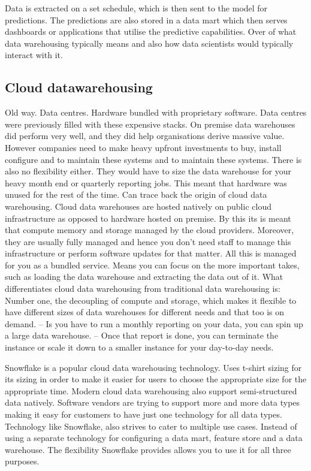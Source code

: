 \documentclass[a4paper, 11pt]{article}
\begin{document}
    Data is extracted on a set schedule, which is then sent to the model for predictions.
    The predictions are also stored in a data mart which then serves dashboards or applications that utilise the predictive capabilities.
    Over of what data warehousing typically means and also how data scientists would typically interact with it.

    \subsection{Cloud datawarehousing}

    Old way. Data centres. Hardware bundled with proprietary software.
    Data centres were previously filled with these expensive stacks.
    On premise data warehouses did perform very well, and they did help organisations derive massive value.
    However companies need to make heavy upfront investments to buy, install configure and to maintain these systems and to maintain these systems.
    There is also no flexibility either.
    They would have to size the data warehouse for your heavy month end or quarterly reporting jobs.
    This meant that hardware was unused for the rest of the time.
    Can trace back the origin of cloud data warehousing.
    Cloud data warehouses are hosted natively on public cloud infrastructure as opposed to hardware hosted on premise.
    By this its is meant that compute memory and storage managed by the cloud providers.
    Moreover, they are usually fully managed and hence you don't need staff to manage this infrastructure or perform software updates for that matter.
    All this is managed for you as a bundled service.
    Means you can focus on the more important takes, such as loading the data warehouse and extracting the data out of it.
    What differentiates cloud data warehousing from traditional data warehousing is:
    Number one, the decoupling of compute and storage, which makes it flexible to have different sizes of data warehouses for different needs and that too is on demand.
    -- Is you have to run a monthly reporting on your data, you can spin up a large data warehouse.
    -- Once that report is done, you can terminate the instance or scale it down to a smaller instance for your day-to-day needs.

    Snowflake is a popular cloud data warehousing technology.
    Uses t-shirt sizing for its sizing in order to make it easier for users to choose the appropriate size for the appropriate time.
    Modern cloud data warehousing also support semi-structured data natively.
    Software vendors are trying to support more and more data types making it easy for customers to have just one technology for all data types.
    Technology like Snowflake, also strives to cater to multiple use cases.
    Instead of using a separate technology for configuring a data mart, feature store and a data warehouse.
    The flexibility Snowflake provides allows you to use it for all three purposes.
\end{document}
